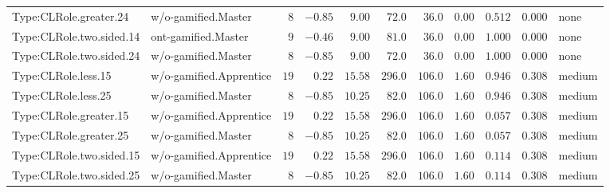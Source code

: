 \documentclass[6pt,a4paper]{article}
\begin{document}
{\begin{longtable}{llrrrrrrrrl}
Type:CLRole.greater.24&w/o-gamified.Master&$ 8$&$-0.85$&$ 9.00$&$ 72.0$&$ 36.0$&$ 0.00$&$0.512$&$0.000$&none\tabularnewline
Type:CLRole.two.sided.14&ont-gamified.Master&$ 9$&$-0.46$&$ 9.00$&$ 81.0$&$ 36.0$&$ 0.00$&$1.000$&$0.000$&none\tabularnewline
Type:CLRole.two.sided.24&w/o-gamified.Master&$ 8$&$-0.85$&$ 9.00$&$ 72.0$&$ 36.0$&$ 0.00$&$1.000$&$0.000$&none\tabularnewline
Type:CLRole.less.15&w/o-gamified.Apprentice&$19$&$ 0.22$&$15.58$&$296.0$&$106.0$&$ 1.60$&$0.946$&$0.308$&medium\tabularnewline
Type:CLRole.less.25&w/o-gamified.Master&$ 8$&$-0.85$&$10.25$&$ 82.0$&$106.0$&$ 1.60$&$0.946$&$0.308$&medium\tabularnewline
Type:CLRole.greater.15&w/o-gamified.Apprentice&$19$&$ 0.22$&$15.58$&$296.0$&$106.0$&$ 1.60$&$0.057$&$0.308$&medium\tabularnewline
Type:CLRole.greater.25&w/o-gamified.Master&$ 8$&$-0.85$&$10.25$&$ 82.0$&$106.0$&$ 1.60$&$0.057$&$0.308$&medium\tabularnewline
\newpage
Type:CLRole.two.sided.15&w/o-gamified.Apprentice&$19$&$ 0.22$&$15.58$&$296.0$&$106.0$&$ 1.60$&$0.114$&$0.308$&medium\tabularnewline
Type:CLRole.two.sided.25&w/o-gamified.Master&$ 8$&$-0.85$&$10.25$&$ 82.0$&$106.0$&$ 1.60$&$0.114$&$0.308$&medium\tabularnewline
\hline
\end{longtable}}
\end{document}
